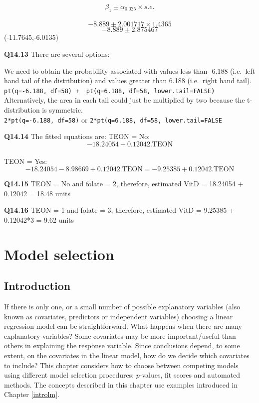 \documentclass[
  oneside]{krantz}
\begin{document}
\[\beta_1 \pm \alpha_0.025 \times s.e.\]\\
\[ -8.889 \pm  2.001717 \times 1.4365\]
\[ -8.889 \pm 2.875467\]
(-11.7645,-6.0135)

\textbf{Q14.13} There are several options:

We need to obtain the probability associated with values less than -6.188 (i.e.~left hand tail of the distribution) and values greater than 6.188 (i.e.~right hand tail).\\
\texttt{pt(q=-6.188,\ df=58)\ +\ \ pt(q=6.188,\ df=58,\ lower.tail=FALSE)}~\\
Alternatively, the area in each tail could just be multiplied by two because the t-distribution is symmetric.\\
\texttt{2*pt(q=-6.188,\ df=58)} or \texttt{2*pt(q=6.188,\ df=58,\ lower.tail=FALSE}

\textbf{Q14.14} The fitted equations are:
TEON = No: \[-18.24054 + 0.12042.\textrm{TEON}\]\\
TEON = Yes: \[-18.24054 -8.98669 + 0.12042.\textrm{TEON}  = 
- 9.25385 + 0.12042.\textrm{TEON} \]

\textbf{Q14.15} TEON = No and folate = 2, therefore, estimated VitD = 18.24054 + 0.12042 = 18.48 units

\textbf{Q14.16} TEON = 1 and folate = 3, therefore, estimated VitD = 9.25385 + 0.12042*3 = 9.62 units

\hypertarget{modelselection}{%
\chapter{Model selection}\label{modelselection}}

\hypertarget{INTmodsel}{%
\section{Introduction}\label{INTmodsel}}

If there is only one, or a small number of possible explanatory variables (also known as covariates, predictors or independent variables) choosing a linear regression model can be straightforward. What happens when there are many explanatory variables? Some covariates may be more important/useful than others in explaining the response variable. Since conclusions depend, to some extent, on the covariates in the linear model, how do we decide which covariates to include? This chapter considers how to choose between competing models using different model selection procedures: \(p\)-values, fit scores and automated methods. The concepts described in this chapter use examples introduced in Chapter \ref{introlm}.
\end{document}
